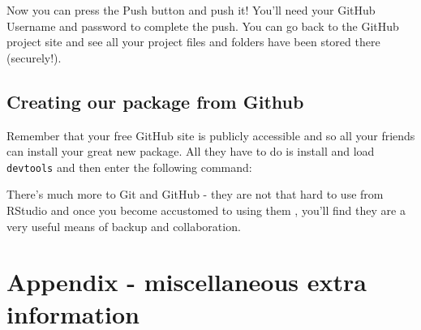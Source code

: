 \documentclass[titlepage]{book}\usepackage{knitr}
\begin{document}
Now you can press the Push button and push it! You'll need your GitHub Username and password to complete the push. You can go back to the GitHub project site and see all your project files and folders have been stored there (securely!).

\section{Creating our package from Github}
Remember that your free GitHub site is publicly accessible and so all your friends can install your great new package.  All they have to do is install and load  \texttt{devtools} and then enter the following command:

\begin{knitrout}
\color{fgcolor}\begin{kframe}
\begin{alltt}
\hlopt{::}\hlstd{(}\hlstd{)}
\end{alltt}
\end{kframe}
\end{knitrout}

There's much more to Git and GitHub - they are not that hard to use from RStudio and once you become accustomed to using them , you'll find they are a very useful means of backup and collaboration.












\chapter{Appendix - miscellaneous extra information}\label{Appendix}


\author{Brian Williams $<$\href{mailto:bjw649@gmail.com}
{bjw649@gmail.com}$>$}
\end{document}
